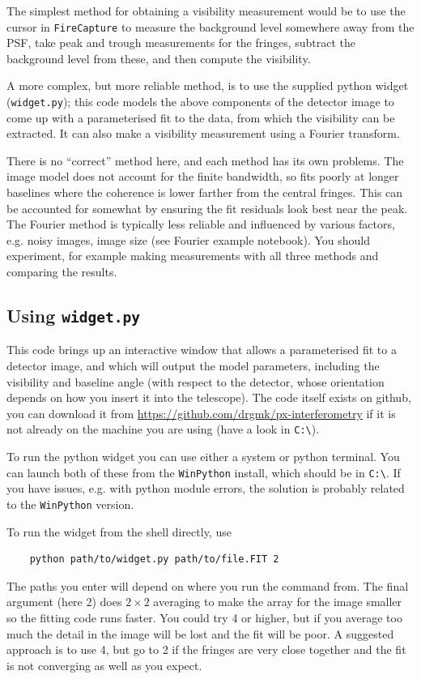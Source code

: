 \documentclass[11pt]{article}
\begin{document}
The simplest method for obtaining a visibility measurement would be to use the cursor in \texttt{FireCapture} to measure the background level somewhere away from the PSF, take peak and trough measurements for the fringes, subtract the background level from these, and then compute the visibility.

A more complex, but more reliable method, is to use the supplied python widget (\texttt{widget.py}); this code models the above components of the detector image to come up with a parameterised fit to the data, from which the visibility can be extracted. It can also make a visibility measurement using a Fourier transform.

There is no ``correct'' method here, and each method has its own problems. The image model does not account for the finite bandwidth, so fits poorly at longer baselines where the coherence is lower farther from the central fringes. This can be accounted for somewhat by ensuring the fit residuals look best near the peak. The Fourier method is typically less reliable and influenced by various factors, e.g. noisy images, image size (see Fourier example notebook). You should experiment, for example making measurements with all three methods and comparing the results.

\subsection{Using \texttt{widget.py}}\label{sec:widget}

This code brings up an interactive window that allows a parameterised fit to a detector image, and which will output the model parameters, including the visibility and baseline angle (with respect to the detector, whose orientation depends on how you insert it into the telescope). The code itself exists on github, you can download it from
\href{https://github.com/drgmk/px-interferometry}{https://github.com/drgmk/px-interferometry} if it is not already on the machine you are using (have a look in \texttt{C:\textbackslash}).

To run the python widget you can use either a system or python terminal. You can launch both of these from the \texttt{WinPython} install, which should be in \texttt{C:\textbackslash}. If you have issues, e.g. with python module errors, the solution is probably related to the \texttt{WinPython} version.

To run the widget from the shell directly, use
\begin{verbatim}
    python path/to/widget.py path/to/file.FIT 2
\end{verbatim}
The paths you enter will depend on where you run the command from.  The final argument (here 2) does $2 \times 2$ averaging to make the array for the image smaller so the fitting code runs faster. You could try 4 or higher, but if you average too much the detail in the image will be lost and the fit will be poor. A suggested approach is to use 4, but go to 2 if the fringes are very close together and the fit is not converging as well as you expect.
\end{document}
